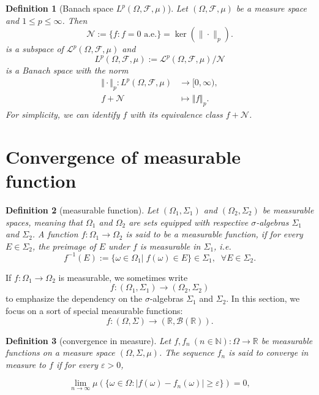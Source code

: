 \documentclass{report}
\newtheorem{definition}{Definition}[section]
\theoremstyle{nonumberplain}
\begin{document}
\begin{definition}[Banach space $L^p(\Omega, \mathcal{F}, \mu)$] Let $(\Omega, \mathcal{F}, \mu)$ be a measure space and $1\le p \leq\infty$. Then
	\[
	\mathcal{N}:=\{f: f=0\text{ a.e.}\}=\operatorname{ker}\left(\|\cdot\|_{p}\right).
	\]
	is a subspace of $\mathcal{L}^{p}(\Omega, \mathcal{F}, \mu)$ and
	\[
	L^{p}(\Omega, \mathcal{F}, \mu):=\mathcal{L}^{p}(\Omega, \mathcal{F}, \mu)/\mathcal{N}
	\]
	is a Banach space with the norm
	\begin{align*}
	\Vert \cdot\Vert_p:L^{p}(\Omega, \mathcal{F}, \mu)&\longrightarrow [0,\infty),\\
	f+\mathcal{N} &\longmapsto \Vert f\Vert_p.
	\end{align*}
    For simplicity, we can identify $f$ with its equivalence class $f+\mathcal{N}$.
\end{definition}


\section{Convergence of measurable function}
\begin{definition}[measurable function]
	Let $(\Omega_1,\Sigma_1 )$ and $(\Omega_2,\Sigma_2)$ be measurable spaces, meaning that $\Omega_1$ and $\Omega_2$ are sets equipped with respective $\sigma$-algebras $\Sigma_1$ and $\Sigma_2$. A function $f:\Omega_1\to \Omega_2$ is said to be a \emph{measurable function}, if for every $E\in \Sigma_2$, the preimage of $E$ under $f$ is measurable in $\Sigma_1$, i.e.
	\[
	f^{-1}(E):=\{\omega\in \Omega_1|\;f(\omega)\in E\}\in \Sigma_1 ,\;\;\forall E\in\Sigma_2.
	\]
\end{definition}
If $f:\Omega_1\to \Omega_2$ is measurable, we sometimes write
$$f\colon (\Omega_1,\Sigma_1 )\rightarrow (\Omega_2,\Sigma_2 )$$
to emphasize the dependency on the $\sigma$-algebras $\Sigma_1$ and $\Sigma_2$.
In this section, we focus on a sort of special measurable functions:
\[
f\colon (\Omega,\Sigma )\rightarrow (\mathbb{R},\mathcal{B}(\mathbb{R}) ).
\]   
\begin{definition}[convergence in measure]
	Let $f,f_{n}\ (n\in {\mathbb  N}):\Omega\to {\mathbb  R}$ be measurable functions on a measure space $(\Omega,\Sigma ,\mu )$. The sequence $ f_{n}$ is said to converge in measure to $f$ if for every $\varepsilon >0$,
	
	$$\lim_{{n\to \infty }}\mu \left(\{\omega\in \Omega:|f(\omega)-f_{n}(\omega)|\geq \varepsilon \}\right)=0,$$
\end{definition}
\end{document}
